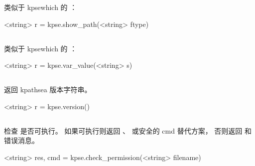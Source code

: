 
类似于 kpsewhich 的 ：

\begin{typing}
<string> r = kpse.show_path(<string> ftype)
\end{typing}

\subsection{}


类似于 kpsewhich 的 ：

\begin{typing}
<string> r = kpse.var_value(<string> s)
\end{typing}

\subsection{}


返回 kpathsea 版本字符串。

\begin{typing}
<string> r = kpse.version()
\end{typing}

\subsection{}


检查  是否可执行。
如果可执行则返回 、 或安全的 cmd 替代方案，
否则返回  和错误消息。

\begin{typing}
<string> res, cmd = kpse.check_permission(<string> filename)
\end{typing}
